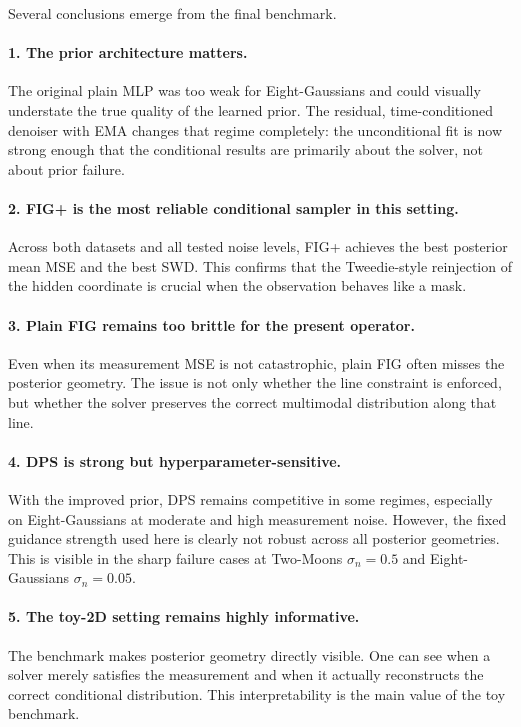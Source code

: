 \documentclass[10pt,twocolumn]{article}
\begin{document}
Several conclusions emerge from the final benchmark.

\paragraph{1. The prior architecture matters.}
The original plain MLP was too weak for Eight-Gaussians and could visually understate the true quality of the learned prior. The residual, time-conditioned denoiser with EMA changes that regime completely: the unconditional fit is now strong enough that the conditional results are primarily about the solver, not about prior failure.

\paragraph{2. FIG+ is the most reliable conditional sampler in this setting.}
Across both datasets and all tested noise levels, FIG+ achieves the best posterior mean MSE and the best SWD. This confirms that the Tweedie-style reinjection of the hidden coordinate is crucial when the observation behaves like a mask.

\paragraph{3. Plain FIG remains too brittle for the present operator.}
Even when its measurement MSE is not catastrophic, plain FIG often misses the posterior geometry. The issue is not only whether the line constraint is enforced, but whether the solver preserves the correct multimodal distribution along that line.

\paragraph{4. DPS is strong but hyperparameter-sensitive.}
With the improved prior, DPS remains competitive in some regimes, especially on Eight-Gaussians at moderate and high measurement noise. However, the fixed guidance strength used here is clearly not robust across all posterior geometries. This is visible in the sharp failure cases at Two-Moons \(\sigma_n=0.5\) and Eight-Gaussians \(\sigma_n=0.05\).

\paragraph{5. The toy-2D setting remains highly informative.}
The benchmark makes posterior geometry directly visible. One can see when a solver merely satisfies the measurement and when it actually reconstructs the correct conditional distribution. This interpretability is the main value of the toy benchmark.
\end{document}
